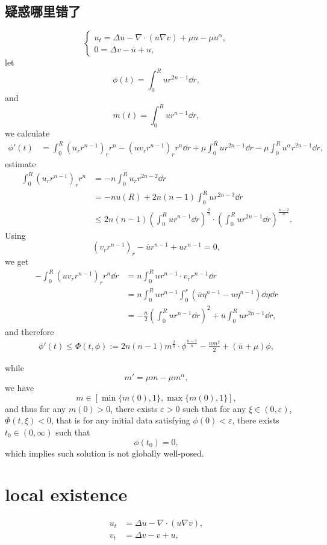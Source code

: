 \subsection{疑惑哪里错了}
\begin{equation}
	\begin{cases}
		u_t = \Delta u - \nabla\cdot(u\nabla v) + \mu u - \mu u^\alpha,\\
		0 = \Delta v - \overline u + u,
	\end{cases}
\end{equation}
let 
\[
	\phi(t) = \int_0^R ur^{2n-1}\dd r,
\]
and
\[
	m(t) = \int_0^R ur^{n-1}\dd r,
\]
we calculate
\begin{align*}
	\phi'(t) &=
	\int_0^R(u_rr^{n-1})_rr^n - (uv_rr^{n-1})_rr^n\dd r 
		+ \mu\int_0^R u r^{2n-1}\dd r - \mu \int_0^Ru^\alpha r^{2n-1}\dd r,
\end{align*}
estimate
\begin{align*}
	\int_0^R(u_rr^{n-1})_rr^n 
		&= - n\int_0^Ru_rr^{2n-2}\dd r\\
		&= -nu(R) + 2n(n-1)\int_0^Rur^{2n-3}\dd r\\
		&\leq 2n(n-1)\left(\int_0^Rur^{n-1}\dd r\right)^{\frac{2}{n}}
			\cdot \left(\int_0^Rur^{2n-1}\dd r\right)^{\frac{n-2}{n}}.
\end{align*}
Using 
\[
	(v_rr^{n-1})_r -\overline{u}r^{n-1} + ur^{n-1} = 0,
\]
we get
\begin{align*}
	- \int_0^R (uv_rr^{n-1})_rr^n\dd r 
		&= n\int_0^Rur^{n-1}\cdot v_rr^{n-1}\dd r \\
		&= n\int_0^R ur^{n-1} \int_0^r(\overline{u}\eta^{n-1} - u\eta^{n-1})\dd\eta\dd r\\
		&= - \frac{n}2\left(\int_0^Rur^{n-1}\dd r\right)^2 + \overline{u}\int_0^R ur^{2n-1}\dd r, 
\end{align*}
and therefore
\begin{align*}
	\phi'(t) \leq \Phi(t, \phi) := 2n(n-1)m^{\frac2n}\cdot \phi^{\frac{n-2}{n}} - \frac{nm^2}2 + (\overline{u} + \mu)\phi,
\end{align*}

while
\[
	m' = \mu m - \mu m^\alpha,
\]
we have 
\[
	m\in\left[\min\{m(0),1\}, \max\{m(0),1\}\right],
\]
and thus for any $m(0)>0$, there exists $\varepsilon>0$ 
such that for any $\xi\in(0,\varepsilon)$,
$\Phi(t,\xi) < 0$,
that is for any initial data satisfying $\phi(0) < \varepsilon$, 
there exists $t_0\in(0,\infty)$ such that 
\[
	\phi(t_0) = 0,
\]
which implies such solution is not globally well-posed.
\section{local existence}
\begin{align*}
	u_t &= \Delta u - \nabla\cdot(u\nabla v),\\
	v_t &= \Delta v - v + u,
\end{align*}

